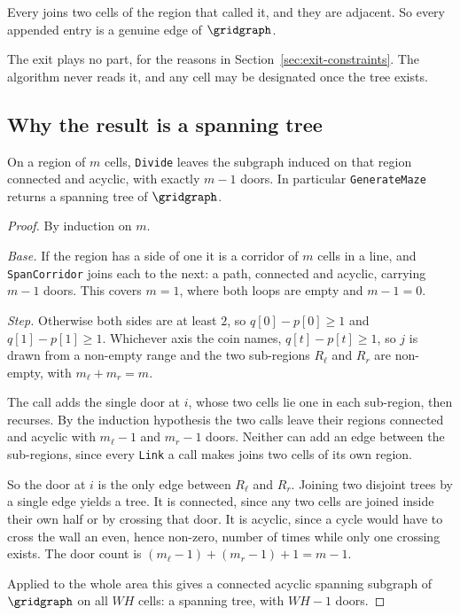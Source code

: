 Every \Link{} joins two cells of the region that called it, and they are
adjacent. So every appended entry is a genuine edge of $\gridgraph$.

The exit plays no part, for the reasons in
Section~\ref{sec:exit-constraints}. The algorithm never reads it, and any cell
may be designated once the tree exists.

\subsection{Why the result is a spanning tree}

\begin{proposition}
\label{prop:generation-is-a-tree}
On a region of $m$ cells, \textup{\texttt{Divide}} leaves the subgraph induced
on that region connected and acyclic, with exactly $m-1$ doors. In particular
\textup{\texttt{GenerateMaze}} returns a spanning tree of $\gridgraph$.
\end{proposition}

\begin{proof}
By induction on $m$.

\emph{Base.} If the region has a side of one it is a corridor of $m$ cells in a
line, and \texttt{SpanCorridor} joins each to the next: a path, connected and
acyclic, carrying $m-1$ doors. This covers $m=1$, where both loops are empty and
$m-1=0$.

\emph{Step.} Otherwise both sides are at least $2$, so $q[0]-p[0]\ge1$ and
$q[1]-p[1]\ge1$. Whichever axis the coin names, $q[t]-p[t]\ge1$, so $j$ is drawn
from a non-empty range and the two sub-regions $R_\ell$ and $R_r$ are non-empty,
with $m_\ell+m_r=m$.

The call adds the single door at $i$, whose two cells lie one in each
sub-region, then recurses. By the induction hypothesis the two calls leave their
regions connected and acyclic with $m_\ell-1$ and $m_r-1$ doors. Neither can add
an edge between the sub-regions, since every \texttt{Link} a call makes joins
two cells of its own region.

So the door at $i$ is the only edge between $R_\ell$ and $R_r$. Joining two
disjoint trees by a single edge yields a tree. It is connected, since any two
cells are joined inside their own half or by crossing that door. It is acyclic,
since a cycle would have to cross the wall an even, hence non-zero, number of
times while only one crossing exists. The door count is
$(m_\ell-1)+(m_r-1)+1=m-1$.

Applied to the whole area this gives a connected acyclic spanning subgraph of
$\gridgraph$ on all $WH$ cells: a spanning tree, with $WH-1$ doors.
\end{proof}

